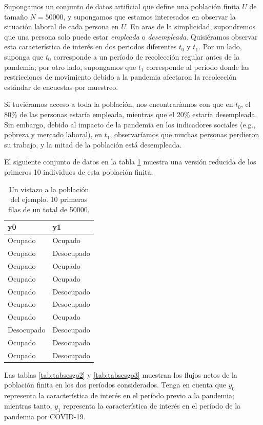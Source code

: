\documentclass[
  12pt,
]{book}
\begin{document}
Supongamos un conjunto de datos artificial que define una población finita \(U\) de tamaño \(N = 50000\), y supongamos que estamos interesados en observar la situación laboral de cada persona en \(U\). En aras de la simplicidad, supondremos que una persona solo puede estar \emph{empleada} o \emph{desempleada}. Quisiéramos observar esta característica de interés en dos periodos diferentes \(t_0\) y \(t_1\). Por un lado, suponga que \(t_0\) corresponde a un período de recolección regular antes de la pandemia; por otro lado, supongamos que \(t_1\) corresponde al período donde las restricciones de movimiento debido a la pandemia afectaron la recolección estándar de encuestas por muestreo.

Si tuviéramos acceso a toda la población, nos encontraríamos con que en \(t_0\), el 80\% de las personas estaría empleada, mientras que el 20\% estaría desempleada. Sin embargo, debido al impacto de la pandemia en los indicadores sociales (e.g., pobreza y mercado laboral), en \(t_1\), observaríamos que muchas personas perdieron su trabajo, y la mitad de la población está desempleada.

El siguiente conjunto de datos en la tabla \ref{tab:tabsesgo1} muestra una versión reducida de los primeros 10 individuos de esta población finita.

\begin{table}

\caption{\label{tab:tabsesgo1}Un vistazo a la población del ejemplo. 10 primeras filas de un total de 50000.}
\centering
\begin{tabular}[t]{l|l}
\hline
y0 & y1\\
\hline
Ocupado & Ocupado\\
\hline
Ocupado & Desocupado\\
\hline
Ocupado & Ocupado\\
\hline
Ocupado & Ocupado\\
\hline
Ocupado & Desocupado\\
\hline
Ocupado & Desocupado\\
\hline
Ocupado & Ocupado\\
\hline
Desocupado & Desocupado\\
\hline
Ocupado & Desocupado\\
\hline
Ocupado & Desocupado\\
\hline
\end{tabular}
\end{table}

Las tablas \ref{tab:tabsesgo2} y \ref{tab:tabsesgo3} muestran los flujos netos de la población finita en los dos períodos considerados. Tenga en cuenta que \(y_0\) representa la característica de interés en el período previo a la pandemia; mientras tanto, \(y_1\) representa la característica de interés en el período de la pandemia por COVID-19.
\end{document}

